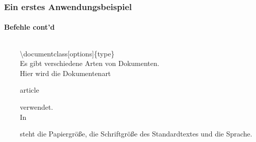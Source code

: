 \begin{frame}
\frametitle{Ein erstes Anwendungsbeispiel}
\framesubtitle{Befehle cont'd}
\begin{columns}
\begin{column}{0.55\textwidth}
\begin{ttfamily}\footnotesize

\end{ttfamily}
\end{column}

\begin{column}{0.45\textwidth}
\color{nounibaredI}\color{nounibaredI}\textbackslash documentclass\color{black}\color{nounibagreenI}[options]\color{black}\{type\} \\
Es gibt verschiedene Arten von Dokumenten.\\ Hier wird die Dokumentenart
\begin{ttfamily}article\end{ttfamily} verwendet.\\
In \begin{ttfamily}[]\end{ttfamily} steht die Papiergröße, die Schriftgröße des
Standardtextes und die Sprache.\\
\end{column}
\end{columns}
\end{frame}




